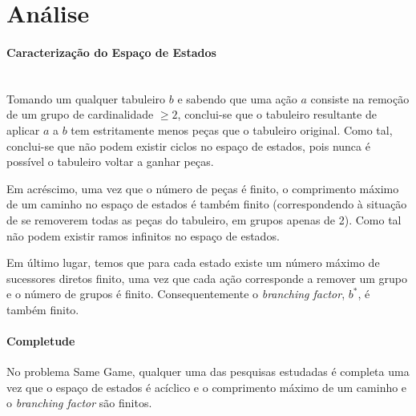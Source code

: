 \documentclass[a4paper]{article}
\begin{document}
    \section{Análise}
    \paragraph{Caracterização do Espaço de Estados}\mbox{} \\
    Tomando um qualquer tabuleiro $b$ e sabendo que uma ação $a$ consiste na remoção de um grupo de cardinalidade $\geq 2$,
    conclui-se que o tabuleiro resultante de aplicar $a$ a $b$ tem estritamente menos peças que o tabuleiro original. Como tal,
    conclui-se que não podem existir ciclos no espaço de estados, pois nunca é possível o tabuleiro voltar a ganhar peças.

    Em acréscimo, uma vez que o número de peças é finito, o comprimento máximo de um caminho no espaço de estados é também finito
    (correspondendo à situação de se removerem todas as peças do tabuleiro, em grupos apenas de 2). Como tal não podem existir
    ramos infinitos no espaço de estados.

    Em último lugar, temos que para cada estado existe um número máximo de sucessores diretos finito, uma vez que cada ação corresponde a
    remover um grupo e o número de grupos é finito. Consequentemente o \textit{branching factor}, $b^*$, é também finito.



    \paragraph{Completude}
    No problema Same Game, qualquer uma das pesquisas estudadas é completa uma vez que o espaço de estados é acíclico e o
    comprimento máximo de um caminho e o \textit{branching factor} são finitos.
\end{document}
